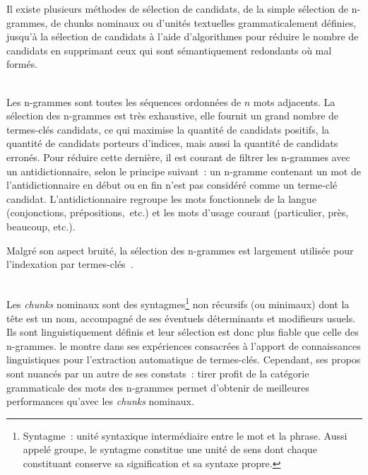     Il existe plusieurs méthodes de sélection de candidats, de la simple
    sélection de n-grammes, de chunks nominaux ou d'unités textuelles
    grammaticalement définies, jusqu'à la sélection de candidats à l'aide
    d'algorithmes pour réduire le nombre de candidats en supprimant ceux qui
    sont sémantiquement redondants où mal formés.

    ~\\Les n-grammes sont
    toutes les séquences ordonnées de $n$ mots adjacents. La sélection des
    n-grammes est très exhaustive, elle fournit un grand nombre de termes-clés
    candidats, ce qui maximise la quantité de candidats positifs, la quantité de
    candidats porteurs d'indices, mais aussi la quantité de candidats erronés.
    Pour réduire cette dernière, il est courant de filtrer les n-grammes avec un
    antidictionnaire, selon le principe suivant~: un n-gramme
    contenant un mot de l'antidictionnaire en début ou en fin n'est pas
    considéré comme un terme-clé candidat. L'antidictionnaire regroupe les mots
    fonctionnels de la langue (conjonctions, prépositions,~etc.) et les mots
    d'usage courant (\og{}particulier\fg{}, \og{}près\fg{}, \og{}beaucoup\fg{},
    etc.).
    
    Malgré son aspect bruité, la sélection des n-grammes est largement utilisée
    pour l'indexation par
    termes-clés~\cite{witten1999kea,hulth2003keywordextraction,medelyan2009humancompetitivetagging}.

    \begin{example}
    \end{example}

    ~\\Les \textit{chunks} nominaux
    sont des syntagmes\footnote{Syntagme~: unité syntaxique
    intermédiaire entre le mot et la phrase. Aussi appelé groupe, le syntagme
    constitue une unité de sens dont chaque constituant conserve sa
    signification et sa syntaxe propre.} non récursifs (ou minimaux) dont la
    tête est un nom, accompagné de ses éventuels déterminants et modifieurs
    usuels. Ils sont linguistiquement définis et leur sélection est donc plus
    fiable que celle des n-grammes.  le
    montre dans ses expériences consacrées à l'apport de connaissances
    linguistiques pour l'extraction automatique de termes-clés. Cependant, ses
    propos sont nuancés par un autre de ses constats~: tirer profit de la
    catégorie grammaticale des mots des n-grammes permet d'obtenir de meilleures
    performances qu'avec les \textit{chunks} nominaux.

